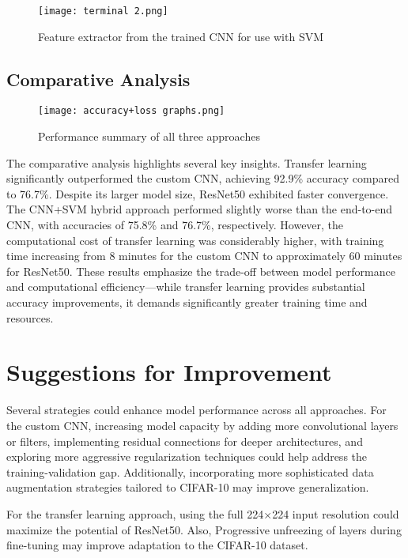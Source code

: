 \documentclass[12pt]{article}
\begin{document}
\begin{figure}[H]
    \centering
    \texttt{[image: terminal 2.png]}
    \caption{Feature extractor from the trained CNN for use with SVM}
    \label{fig:comparison}
\end{figure}


\subsection{Comparative Analysis}


\begin{figure}[H]
    \centering
    \texttt{[image: accuracy+loss graphs.png]}
    \caption{Performance summary of all three approaches}
    \label{fig:comparison_terminal}
\end{figure}

The comparative analysis highlights several key insights. Transfer learning significantly outperformed the custom CNN, achieving 92.9\% accuracy compared to 76.7\%. Despite its larger model size, ResNet50 exhibited faster convergence. The CNN+SVM hybrid approach performed slightly worse than the end-to-end CNN, with accuracies of 75.8\% and 76.7\%, respectively. However, the computational cost of transfer learning was considerably higher, with training time increasing from 8 minutes for the custom CNN to approximately 60 minutes for ResNet50. These results emphasize the trade-off between model performance and computational efficiency—while transfer learning provides substantial accuracy improvements, it demands significantly greater training time and resources.

\section{Suggestions for Improvement}
Several strategies could enhance model performance across all approaches. For the custom CNN, increasing model capacity by adding more convolutional layers or filters, implementing residual connections for deeper architectures, and exploring more aggressive regularization techniques could help address the training-validation gap. Additionally, incorporating more sophisticated data augmentation strategies tailored to CIFAR-10 may improve generalization.

For the transfer learning approach, using the full 224×224 input resolution could maximize the potential of ResNet50. Also, Progressive unfreezing of layers during fine-tuning may improve adaptation to the CIFAR-10 dataset.
\end{document}
